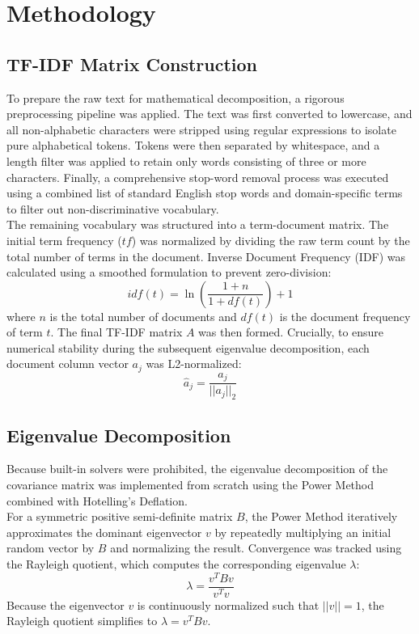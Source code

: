 \documentclass[conference]{IEEEtran}
\begin{document}
\section{Methodology}

\subsection{TF-IDF Matrix Construction}
To prepare the raw text for mathematical decomposition, a rigorous preprocessing pipeline was applied. The text was first converted to lowercase, and all non-alphabetic characters were stripped using regular expressions to isolate pure alphabetical tokens. Tokens were then separated by whitespace, and a length filter was applied to retain only words consisting of three or more characters. Finally, a comprehensive stop-word removal process was executed using a combined list of standard English stop words and domain-specific terms to filter out non-discriminative vocabulary.
\\
The remaining vocabulary was structured into a term-document matrix. The initial term frequency ($tf$) was normalized by dividing the raw term count by the total number of terms in the document. Inverse Document Frequency (IDF) was calculated using a smoothed formulation to prevent zero-division:
\begin{equation}
    idf(t) = \ln \left( \frac{1 + n}{1 + df(t)} \right) + 1
\end{equation}
where $n$ is the total number of documents and $df(t)$ is the document frequency of term $t$. The final TF-IDF matrix $A$ was then formed. Crucially, to ensure numerical stability during the subsequent eigenvalue decomposition, each document column vector $a_j$ was L2-normalized:
\begin{equation}
    \hat{a}_j = \frac{a_j}{||a_j||_2}
\end{equation}

\subsection{Eigenvalue Decomposition}
Because built-in solvers were prohibited, the eigenvalue decomposition of the covariance matrix was implemented from scratch using the Power Method combined with Hotelling's Deflation.
\\
For a symmetric positive semi-definite matrix $B$, the Power Method iteratively approximates the dominant eigenvector $v$ by repeatedly multiplying an initial random vector by $B$ and normalizing the result. Convergence was tracked using the Rayleigh quotient, which computes the corresponding eigenvalue $\lambda$:
\begin{equation}
    \lambda = \frac{v^T B v}{v^T v}
\end{equation}
Because the eigenvector $v$ is continuously normalized such that $||v|| = 1$, the Rayleigh quotient simplifies to $\lambda = v^T B v$.\\
\end{document}
